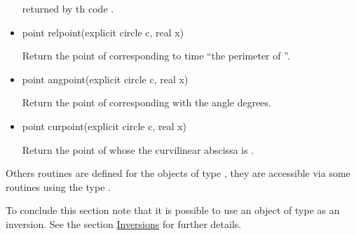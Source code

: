 \documentclass[pdftex]{article}
\begin{document}
\begin{itemize}
  returned  by th code .
\item {}
  \begin{Vcolor}
    point relpoint(explicit circle c, real x)
  \end{Vcolor}
  Return the point of  corresponding to  time ``the
  perimeter of ''.
\item {}
  \begin{Vcolor}
    point angpoint(explicit circle c, real x)
  \end{Vcolor}
  Return the point of  corresponding with the angle 
  degrees.
\item {}
  \begin{Vcolor}
    point curpoint(explicit circle c, real x)
  \end{Vcolor}
  Return the point of  whose the curvilinear abscissa is .
\end{itemize}
Others routines are defined for the objects of type ,
they are accessible via some routines using the type .

To conclude this section note that it is possible to use an object
of type  as an inversion. See
the section \href{#section.inversion}{Inversions} for further details.
\end{document}
